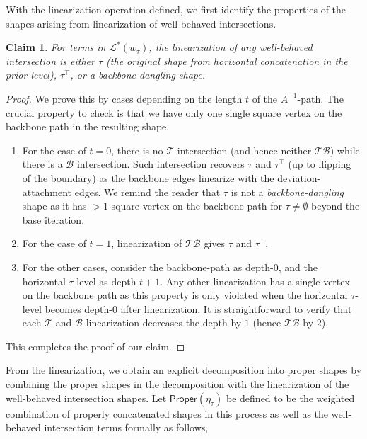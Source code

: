 \documentclass[12pt]{article}
\newtheorem{claim}[theorem]{Claim}
\newcommand{\calB}{\mathcal{B}}
\newcommand{\calT}{\mathcal{T}}
\newcommand{\calL}{\mathcal{L}}
\begin{document}
%
With the linearization operation defined, we first identify the properties of the shapes arising from linearization of well-behaved intersections.
\begin{claim} For terms in $\calL^*(w_\tau)$, the linearization of any well-behaved intersection is either $\tau$ (the original shape from horizontal concatenation in the prior level), $\tau^\top$, or a backbone-dangling shape. \label{clm:linearized-property-vertical}
\end{claim}
\begin{proof}
	We prove this by cases depending on the length $t$ of the $A^{-1}$-path. The crucial property to check is that we have only one single square vertex on the backbone path in the resulting shape.
\begin{enumerate}
	\item For the case of $t=0$, there is no $\mathcal{T}$ intersection (and hence neither $\mathcal{TB}$) while there is a $\mathcal{B}$ intersection. Such intersection recovers $\tau$ and $\tau^\top$ (up to flipping of the boundary) as the backbone edges linearize with the deviation-attachment edges. We remind the reader that $\tau$ is not a \emph{backbone-dangling} shape as it has $>1$ square vertex on the backbone path for $\tau\neq \emptyset$ beyond the base iteration.
	\item For the case of $t=1$, linearization of $\mathcal{TB}$ gives $\tau$ and $\tau^\top$. 
	\item For the other cases, consider the backbone-path as depth-$0$, and the horizontal-$\tau$-level as depth $t+1$. Any other linearization has a single vertex on the backbone path as this property is only violated when the horizontal $\tau$-level becomes depth-$0$ after linearization. It is straightforward to verify that each $\calT$ and $\calB$ linearization decreases the depth by $1$ (hence $\mathcal{TB}$ by $2$).
\end{enumerate}	
This completes the proof of our claim.
	\end{proof}
 From the linearization, we obtain an explicit decomposition into proper shapes by combining the proper shapes in the decomposition with the linearization of the well-behaved intersection shapes. Let $\mathsf{Proper}(\eta_\tau)$ be defined to be the weighted combination of properly concatenated shapes in this process as well as the well-behaved intersection terms formally as follows,
\end{document}
